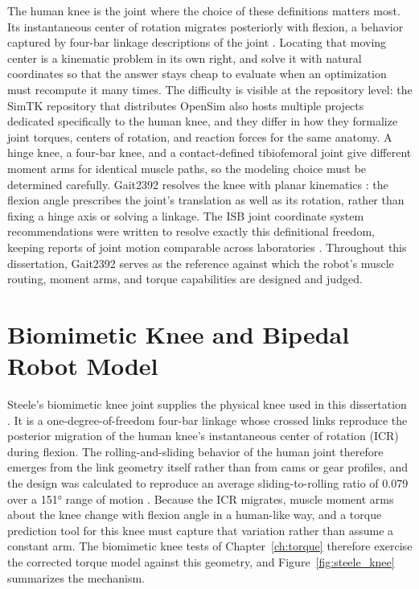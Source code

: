 The human knee is the joint where the choice of these definitions matters most. Its instantaneous center of rotation migrates posteriorly with flexion, a behavior captured by four-bar linkage descriptions of the joint \citep{romero_four-bar_2020, steele_biomimetic_2018}. Locating that moving center is a kinematic problem in its own right, and \citet{romero_four-bar_2020} solve it with natural coordinates so that the answer stays cheap to evaluate when an optimization must recompute it many times. The difficulty is visible at the repository level: the SimTK repository that distributes OpenSim also hosts multiple projects dedicated specifically to the human knee, and they differ in how they formalize joint torques, centers of rotation, and reaction forces for the same anatomy. A hinge knee, a four-bar knee, and a contact-defined tibiofemoral joint give different moment arms for identical muscle paths, so the modeling choice must be determined carefully. Gait2392 resolves the knee with planar kinematics \citep{yamaguchi_planar_1989}: the flexion angle prescribes the joint's translation as well as its rotation, rather than fixing a hinge axis or solving a linkage. The ISB joint coordinate system recommendations were written to resolve exactly this definitional freedom, keeping reports of joint motion comparable across laboratories \citep{wu_isb_2002}. Throughout this dissertation, Gait2392 serves as the reference against which the robot's muscle routing, moment arms, and torque capabilities are designed and judged.

\section{Biomimetic Knee and Bipedal Robot Model}\label{sec:bg_knee}

Steele's biomimetic knee joint supplies the physical knee used in this dissertation \citep{steele_development_2017, steele_biomimetic_2018, steele_biomimetic_2018-1}. It is a one-degree-of-freedom four-bar linkage whose crossed links reproduce the posterior migration of the human knee's instantaneous center of rotation (ICR) during flexion. The rolling-and-sliding behavior of the human joint therefore emerges from the link geometry itself rather than from cams or gear profiles, and the design was calculated to reproduce an average sliding-to-rolling ratio of 0.079 over a \ang{151} range of motion \citep{steele_biomimetic_2018-1}. Because the ICR migrates, muscle moment arms about the knee change with flexion angle in a human-like way, and a torque prediction tool for this knee must capture that variation rather than assume a constant arm. The biomimetic knee tests of Chapter~\ref{ch:torque} therefore exercise the corrected torque model against this geometry, and Figure~\ref{fig:steele_knee} summarizes the mechanism.

